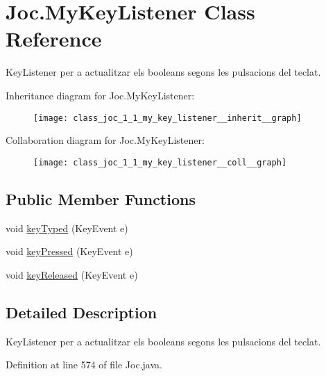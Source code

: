 \hypertarget{class_joc_1_1_my_key_listener}{}\section{Joc.\+My\+Key\+Listener Class Reference}
\label{class_joc_1_1_my_key_listener}


Key\+Listener per a actualitzar els booleans segons les pulsacions del teclat.  




Inheritance diagram for Joc.\+My\+Key\+Listener\+:\nopagebreak
\begin{figure}[H]
\begin{center}
\leavevmode
\texttt{[image: class\_joc\_1\_1\_my\_key\_listener\_\_inherit\_\_graph]}
\end{center}
\end{figure}


Collaboration diagram for Joc.\+My\+Key\+Listener\+:\nopagebreak
\begin{figure}[H]
\begin{center}
\leavevmode
\texttt{[image: class\_joc\_1\_1\_my\_key\_listener\_\_coll\_\_graph]}
\end{center}
\end{figure}
\subsection*{Public Member Functions}
\begin{DoxyCompactItemize}
\item 
void \hyperlink{class_joc_1_1_my_key_listener_a4ca06e4f3950c3745be88c484f12df85}{key\+Typed} (Key\+Event e)
\item 
void \hyperlink{class_joc_1_1_my_key_listener_a14addef50fc960bcd8e4ce5cc3d9c643}{key\+Pressed} (Key\+Event e)
\item 
void \hyperlink{class_joc_1_1_my_key_listener_af5f550e0c17018b1bce4648782aaa9fb}{key\+Released} (Key\+Event e)
\end{DoxyCompactItemize}


\subsection{Detailed Description}
Key\+Listener per a actualitzar els booleans segons les pulsacions del teclat. 

Definition at line 574 of file Joc.\+java.



